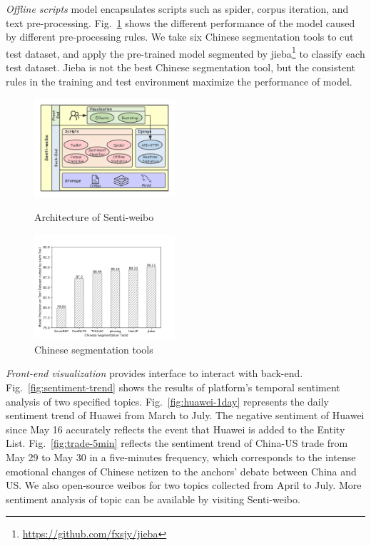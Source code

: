 \documentclass[runningheads]{llncs}
\begin{document}
\textit{Offline scripts} model encapsulates scripts such as spider, corpus iteration, and text pre-processing. Fig.~\ref{fig:segmentation-tools-precision} shows the different performance of the model caused by different pre-processing rules. We take six Chinese segmentation tools to cut test dataset, and apply the pre-trained model segmented by jieba\footnote{\url{https://github.com/fxsjy/jieba}} to classify each test dataset. Jieba is not the best Chinese segmentation tool, but the consistent rules in the training and test environment maximize the performance of model.

\begin{figure}[htbp]
\vspace{-0.5cm}   %
\centering
\begin{minipage}[t]{0.43\textwidth}
\centering
\includegraphics[width=5.2cm]{images/Architecture-of-Senti-weibo-3.png}
\caption{Architecture of Senti-weibo}
\label{fig:Senti-weibo}
\end{minipage}
\begin{minipage}[t]{0.43\textwidth}
\centering
\includegraphics[width=5.2cm]{images/model-precision-on-test-dataset-cutted-by-each-tool.png}
\caption{Chinese segmentation tools}
\label{fig:segmentation-tools-precision}
\end{minipage}
\end{figure}

\textit{Front-end visualization} provides interface to interact with back-end. Fig.~\ref{fig:sentiment-trend} shows the results of platform's temporal sentiment analysis of two specified topics. Fig.~\ref{fig:huawei-1day} represents the daily sentiment trend of Huawei from March to July. The negative sentiment of Huawei since May 16 accurately reflects the event that Huawei is added to the Entity List. Fig.~\ref{fig:trade-5min} reflects the sentiment trend of China-US trade from May 29 to May 30 in a five-minutes frequency, which corresponds to the intense emotional changes of Chinese netizen to the anchors' debate between China and US. We also open-source weibos for two topics collected from April to July. More sentiment analysis of topic can be available by visiting Senti-weibo. 
\end{document}
